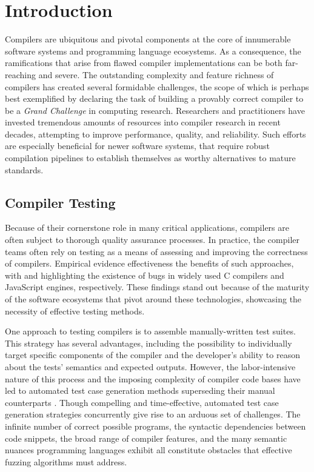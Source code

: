 \chapter{\label{cha:intro}Introduction}

Compilers are ubiquitous and pivotal components
at the core of innumerable software systems and programming language ecosystems.
As a consequence, the ramifications that arise from flawed
compiler implementations can be both far-reaching and severe.
The outstanding complexity and feature richness of compilers has created
several formidable challenges, the scope of which is perhaps best exemplified
by \citet{hoare2003verifying}
declaring the task of building a provably correct compiler to be a 
\textit{Grand Challenge} in computing research.
Researchers and practitioners have invested tremendous amounts of resources
into compiler research in recent decades, attempting to improve
performance, quality, and reliability. 
Such efforts are especially beneficial for newer software systems,
that require robust compilation pipelines to establish themselves
as worthy alternatives to mature standards.


\section{Compiler Testing}

Because of their cornerstone role in many critical applications,
compilers are often subject to thorough quality assurance processes.
In practice, the compiler teams often rely on testing as a means
of assessing and improving the correctness of compilers.
Empirical evidence effectiveness the benefits of such approaches,
with \citet{sun2016toward} and \citet{holler2012fuzzing} highlighting
the existence of bugs in widely used C compilers and JavaScript engines, respectively. 
These findings stand out because of the maturity of the
software ecosystems that pivot around these technologies, showcasing
the necessity of effective testing methods.

One approach to testing compilers is to assemble manually-written test suites.
This strategy has several advantages, including the possibility to individually
target specific components of the compiler and the developer's ability to
reason about the tests' semantics and expected outputs.
However, the labor-intensive nature of this process and 
the imposing complexity of compiler code bases have
led to automated test case generation methods superseding their 
manual counterparts \citep{chen2020survey, zhao2009automated}.
Though compelling and time-effective, automated test case
generation strategies concurrently give rise to an arduous set of challenges.
The infinite number of correct possible programs,
the syntactic dependencies between code snippets,
the broad range of compiler features,
and the many semantic nuances programming languages exhibit all constitute
obstacles that effective fuzzing algorithms must address.


